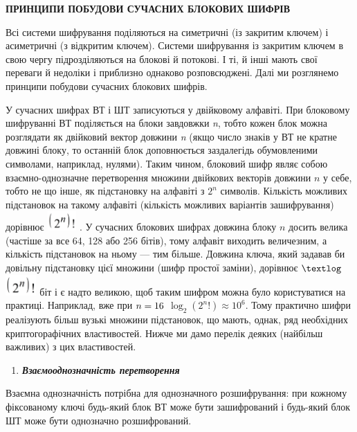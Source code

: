 \bigskip

{\centering\bfseries
ПРИНЦИПИ ПОБУДОВИ СУЧАСНИХ БЛОКОВИХ ШИФРІВ
\par}


\bigskip


\bigskip

Всі системи шифрування поділяються на симетричні (із закритим ключем) і
асиметричні (з відкритим ключем). Системи шифрування із закритим ключем в свою
чергу підрозділяються на блокові й потокові. І ті, й інші мають свої переваги й
недоліки і  приблизно однаково розповсюджені. Далі ми розглянемо принципи
побудови сучасних блокових шифрів.

У сучасних шифрах ВТ і ШТ записуються у двійковому алфавіті. При блоковому
шифруванні ВТ поділяється на блоки завдовжки \textit{n}, тобто кожен блок можна
розглядати як двійковий вектор довжини \textit{n }(якщо число знаків у ВТ не
кратне довжині блоку, то останній блок доповнюється заздалегідь обумовленими
символами, наприклад, нулями). Таким чином, блоковий шифр являє собою
взаємно-однозначне перетворення множини двійкових векторів довжини  $n$ у
себе, тобто не що інше, як підстановку на алфавіті з  $2^n$ символів.
Кількість  можливих підстановок на такому алфавіті (кількість можливих
варіантів зашифрування)  дорівнює 
\includegraphics[width=0.4374in,height=0.2909in]{crypt-img/crypt-img292.png} .
У сучасних блокових шифрах довжина блоку  $n$ досить велика (частіше за все
64,  128 або 256 бітів), тому алфавіт виходить величезним, а кількість
підстановок на ньому --- тим більше. Довжина ключа, який задавав би довільну
підстановку  цієї множини (шифр простої заміни), дорівнює  $\textlog$
\includegraphics[width=0.4646in,height=0.3134in]{crypt-img/crypt-img293.png} 
біт і є надто великою, щоб таким шифром можна було користуватися на практиці.
Наприклад, вже при  $n=\text16$   ${\log _{2}(2^{n}!)\approx
\text{10}^{6}}$. Тому практично шифри реалізують більш вузькі множини
підстановок, що мають, однак, ряд необхідних криптогорафічних властивостей.
Нижче ми дамо перелік деяких (найбільш важливих) з цих властивостей.


\bigskip

\liststyleWWviiiNumix
\begin{enumerate}
\item {\bfseries\itshape
Взаємооднозначність перетворення}
\end{enumerate}
 Взаємна однозначність потрібна для однозначного розшифрування: при кожному
фіксованому ключі будь-який блок ВТ може бути зашифрований і будь-який блок ШТ
може бути однозначно розшифрований.


